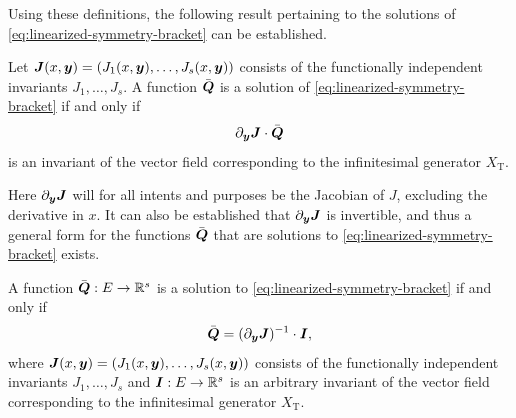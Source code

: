 Using these definitions, the following result pertaining to the solutions of \cref{eq:linearized-symmetry-bracket} can be established.
\begin{thm}
  Let \(\vect{J}(x, \vect{y}) = \left(J_1(x, \vect{y}), \dots, J_s(x, \vect{y})\right)\) consists of the functionally independent invariants \(J_1, \dots, J_s\).
  A function \(\bar{\boldsymbol{Q}}\) is a solution of \cref{eq:linearized-symmetry-bracket} if and only if
  \begin{equation*}
    \partial_{\boldsymbol{y}} \boldsymbol{J} \cdot \bar{\boldsymbol{Q}}
  \end{equation*}
  is an invariant of the vector field corresponding to the infinitesimal generator \(X_{\text{T}}\).
\end{thm}
Here \(\partial_{\boldsymbol{y}} \boldsymbol{J}\) will for all intents and purposes be the Jacobian of \(J\), excluding the derivative in \(x\).
It can also be established that \(\partial_{\boldsymbol{y}} \boldsymbol{J}\) is invertible, and thus a general form for the functions \(\bar{\boldsymbol{Q}}\) that are solutions to \cref{eq:linearized-symmetry-bracket} exists.
\begin{cor} \label{cor:reduced-characteristic-decomposition}
  A function \(\bar{\boldsymbol{Q}}: E \to \mathbb{R}^s\) is a solution to \cref{eq:linearized-symmetry-bracket} if and only if
  \begin{equation*}
    \bar{\boldsymbol{Q}} = (\partial_{\boldsymbol{y}} \boldsymbol{J})^{-1} \cdot \boldsymbol{I},
  \end{equation*}
  where \(\vect{J}(x, \vect{y}) = \left(J_1(x, \vect{y}), \dots, J_s(x, \vect{y})\right)\) consists of the functionally independent invariants \(J_1, \dots, J_s\) and \(\boldsymbol{I}: E \to \mathbb{R}^s\) is an arbitrary invariant of the vector field corresponding to the infinitesimal generator \(X_{\text{T}}\).
\end{cor}
